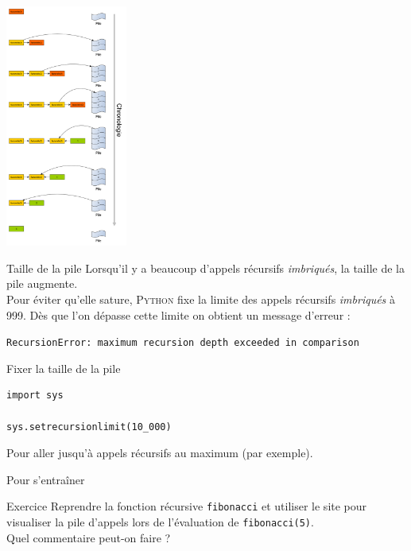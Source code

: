 \documentclass[10pt]{nsibeamer}
\begin{document}
\begin{frame}{}
    \begin{center}
        \includegraphics[width=4cm]{img/appels}
    \end{center}
\end{frame}

%

\begin{frame}{Taille de la pile}
    Lorsqu'il y a beaucoup d'appels récursifs \textit{imbriqués}, la taille de la pile augmente.\\\pause
    Pour éviter qu'elle sature, \textsc{Python} fixe la limite des appels récursifs \textit{imbriqués} à 999. Dès que l'on dépasse cette limite on obtient un message d'erreur :\\\pause
    
    \color{red} \texttt{\footnotesize RecursionError: maximum recursion depth exceeded in comparison}\color{black}\\
\end{frame}

%

\begin{frame}[fragile]{Fixer la taille de la pile}
    \begin{verbatim}
import sys

sys.setrecursionlimit(10_000)
\end{verbatim}
    
    Pour aller jusqu'à  appels récursifs au maximum (par exemple).
\end{frame}

%

\begin{frame}{Pour s'entraîner}
    \begin{alertblock}{Exercice}
        Reprendre la fonction récursive \texttt{fibonacci} et utiliser le site  pour visualiser la pile d'appels lors de l'évaluation de \texttt{fibonacci(5)}.\\
        
        Quel commentaire peut-on faire ?
    \end{alertblock}
\end{frame}

%
\end{document}
